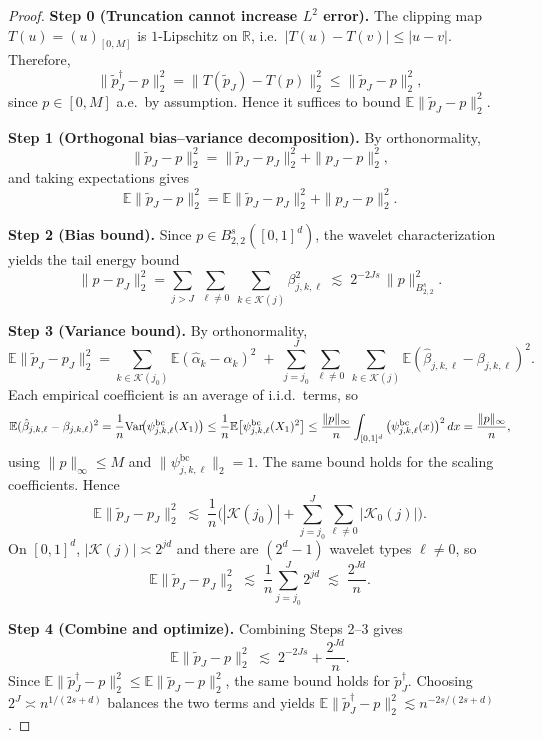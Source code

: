 \documentclass{article}
\theoremstyle{plain}
\theoremstyle{definition}
\def\EE{\mathbb{E}}
\def\RR{\mathbb{R}}
\def\calK{\mathcal{K}}
\theoremstyle{plain}
\def\EE{\mathbb{E}}
\def\RR{\mathbb{R}}
\def\calK{\mathcal{K}}
\begin{document}
\begin{proof}
\textbf{Step 0 (Truncation cannot increase $L^2$ error).}
The clipping map $T(u)=(u)_{[0,M]}$ is $1$-Lipschitz on $\RR$, i.e.\ $|T(u)-T(v)|\le |u-v|$.
Therefore,
\[
\|\tilde p_J^{\dagger} - p\|_2^2
=
\|T(\tilde p_J)-T(p)\|_2^2
\le
\|\tilde p_J - p\|_2^2,
\]
since $p\in[0,M]$ a.e.\ by assumption. Hence it suffices to bound $\EE\|\tilde p_J-p\|_2^2$.

\textbf{Step 1 (Orthogonal bias--variance decomposition).}
By orthonormality,
\[
\|\tilde p_J - p\|_2^2
=
\|\tilde p_J - p_J\|_2^2 + \|p_J - p\|_2^2,
\]
and taking expectations gives
\[
\EE\|\tilde p_J - p\|_2^2
=
\EE\|\tilde p_J - p_J\|_2^2 + \|p_J - p\|_2^2.
\]

\textbf{Step 2 (Bias bound).}
Since $p\in B^s_{2,2}([0,1]^d)$,
the wavelet characterization yields the tail energy bound
\[
\|p-p_J\|_2^2
=
\sum_{j>J}\ \sum_{\ell\neq 0}\ \sum_{k\in\calK(j)} \beta_{j,k,\ell}^2
\;\lesssim\;
2^{-2Js}\,\|p\|_{B^s_{2,2}}^2.
\]

\textbf{Step 3 (Variance bound).}
By orthonormality,
\[
\EE\|\tilde p_J - p_J\|_2^2
=
\sum_{k\in\calK(j_0)} \EE(\hat\alpha_k-\alpha_k)^2
\;+\;
\sum_{j=j_0}^{J}\ \sum_{\ell\neq 0}\ \sum_{k\in\calK(j)}
\EE(\hat\beta_{j,k,\ell}-\beta_{j,k,\ell})^2.
\]
Each empirical coefficient is an average of i.i.d.\ terms, so
\[
\EE(\hat\beta_{j,k,\ell}-\beta_{j,k,\ell})^2
=
\frac{1}{n}\textup{Var}\!\big(\psi^{\mathrm{bc}}_{j,k,\ell}(X_1)\big)
\le
\frac{1}{n}\EE\big[\psi^{\mathrm{bc}}_{j,k,\ell}(X_1)^2\big]
\le
\frac{\|p\|_{\infty}}{n}\int_{[0,1]^d} \big(\psi^{\mathrm{bc}}_{j,k,\ell}(x)\big)^2\,dx
=
\frac{\|p\|_{\infty}}{n},
\]
using $\|p\|_\infty\le M$ and $\|\psi^{\mathrm{bc}}_{j,k,\ell}\|_2=1$.
The same bound holds for the scaling coefficients.
Hence
\[
\EE\|\tilde p_J - p_J\|_2^2
\;\lesssim\;
\frac{1}{n}\Big(|\calK(j_0)| + \sum_{j=j_0}^{J}\sum_{\ell\neq 0}|\calK_0(j)|\Big).
\]
On $[0,1]^d$, $|\calK(j)|\asymp 2^{jd}$ and there are $(2^d-1)$ wavelet types $\ell\neq 0$, so
\[
\EE\|\tilde p_J - p_J\|_2^2 \;\lesssim\; \frac{1}{n}\sum_{j=j_0}^{J} 2^{jd}
\;\lesssim\; \frac{2^{Jd}}{n}.
\]

\textbf{Step 4 (Combine and optimize).}
Combining Steps 2--3 gives
\[
\EE\|\tilde p_J - p\|_2^2 \;\lesssim\; 2^{-2Js} + \frac{2^{Jd}}{n}.
\]
Since $\EE\|\tilde p_J^{\dagger}-p\|_2^2\le \EE\|\tilde p_J-p\|_2^2$, the same bound holds for $\tilde p_J^{\dagger}$.
Choosing $2^J\asymp n^{1/(2s+d)}$ balances the two terms and yields
$\EE\|\tilde p_J^{\dagger}-p\|_2^2 \lesssim n^{-2s/(2s+d)}$.
\end{proof}
\end{document}
